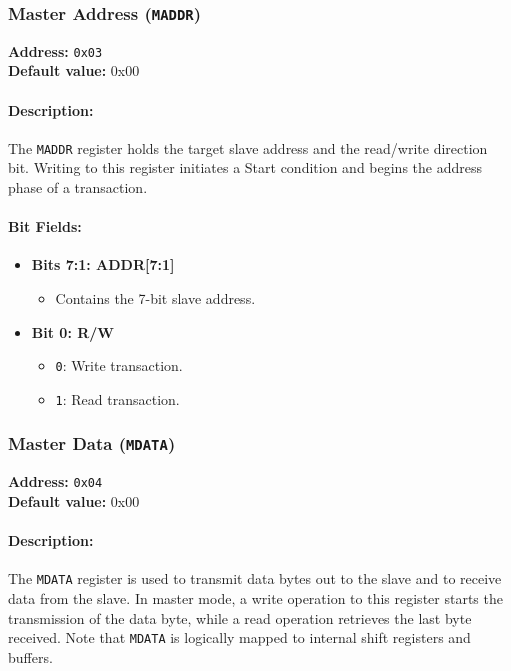 \vspace{2mm}

\subsubsection{Master Address (\texttt{MADDR})}
\label{sec:maddr}

\textbf{Address:} \texttt{0x03} \\
\textbf{Default value:} 0x00

\paragraph{Description:}  
The \texttt{MADDR} register holds the target slave address and the read/write direction bit. Writing to this register
initiates a Start condition and begins the address phase of a transaction.

\paragraph{Bit Fields:}
\begin{itemize}[leftmargin=*,itemsep=2mm]
  \item \textbf{Bits 7:1: ADDR[7:1]}  
        \begin{itemize}
          \item Contains the 7-bit slave address.
        \end{itemize}
  \item \textbf{Bit 0: R/W}  
        \begin{itemize}
          \item \texttt{0}: Write transaction.
          \item \texttt{1}: Read transaction.
        \end{itemize}
\end{itemize}

\vspace{2mm}

\subsubsection{Master Data (\texttt{MDATA})}
\label{sec:mdata}

\textbf{Address:} \texttt{0x04} \\
\textbf{Default value:} 0x00

\paragraph{Description:}  
The \texttt{MDATA} register is used to transmit data bytes out to the slave and to receive data from the slave.
In master mode, a write operation to this register starts the transmission of the data byte, while a read operation
retrieves the last byte received. Note that \texttt{MDATA} is logically mapped to internal shift registers and buffers.

